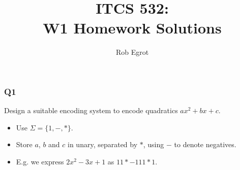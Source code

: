 \documentclass[handout]{beamer}
\title{ITCS 532:\\ W1 Homework Solutions}
\date{}
\author{Rob Egrot}
\begin{document}
\begin{frame}
\titlepage
\end{frame}

\begin{frame}
\frametitle{Q1}
Design a suitable encoding system to encode quadratics $ax^2 + bx + c$.
\vspace{0.5cm}
\begin{itemize}
\item Use $\Sigma = \{1,-,*\}$. 
\vspace{0.5cm}
\item Store $a$, $b$ and $c$ in unary, separated by $*$, using $-$ to denote negatives. 
\vspace{0.5cm}
\item E.g. we express $2x^2 - 3x +1$ as $11*-111*1$.
\end{itemize}

\end{frame}
\end{document}
